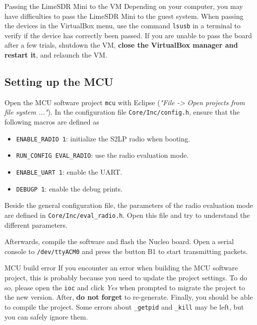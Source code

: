 \begin{bclogo}[couleur = gray!20, arrondi = 0.2, logo=\bcinfo]{Passing the LimeSDR Mini to the VM}
    Depending on your computer, you may have difficulties to pass the LimeSDR Mini to the guest system.
    When passing the devices in the VirtualBox menu, use the command \texttt{lsusb} in a terminal to verify if the device has correctly been passed.
    If you are unable to pass the board after a few trials, shutdown the VM, \textbf{close the VirtualBox manager and restart it}, and relaunch the VM.
\end{bclogo}

\subsection{Setting up the MCU}

Open the MCU software project \texttt{mcu} with Eclipse (\textit{"File -> Open projects from file system ..."}).
In the configuration file \texttt{Core/Inc/config.h}, ensure that the following macros are defined as
\begin{itemize}
    \item \texttt{ENABLE\_RADIO 1}: initialize the S2LP radio when booting.
    \item \texttt{RUN\_CONFIG EVAL\_RADIO}: use the radio evaluation mode.
    \item \texttt{ENABLE\_UART 1}: enable the UART.
    \item \texttt{DEBUGP 1}: enable the debug prints.
\end{itemize}

Beside the general configuration file, the parameters of the radio evaluation mode are defined in \texttt{Core/Inc/eval\_radio.h}.
Open this file and try to understand the different parameters.

Afterwards, compile the software and flash the Nucleo board. Open a serial console to \texttt{/dev/ttyACM0} and press the button B1 to start
transmitting packets.

\begin{bclogo}[couleur = gray!20, arrondi = 0.2, logo=\bcinfo]{MCU build error}
    If you encounter an error when building the MCU software project, this is probably because you need to update the project settings. To do so, please open the \texttt{ioc} and click \textit{Yes} when prompted to migrate the project to the new version. After, \textbf{do not forget} to re-generate. Finally, you should be able to compile the project. Some errors about \texttt{\_getpid} and \texttt{\_kill} may be left, but you can safely ignore them.
\end{bclogo}

